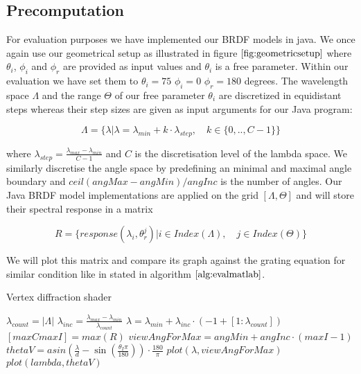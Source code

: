 \subsection{Precomputation}
\label{sec:evalprecomp}
For evaluation purposes we have implemented our BRDF models in java. We once again use our geometrical setup as illustrated in figure $\ref{fig:geometricsetup}$ where $\theta_i$, $\phi_i$ and $\phi_r$ are provided as input values and $\theta_i$ is a free parameter. Within our evaluation we have set them to $\theta_i = 75$ $\phi_i = 0$ $\phi_r = 180$ degrees. The wavelength space $\Lambda$ and the range $\Theta$ of our free parameter $\theta_i$ are discretized in equidistant steps whereas their step sizes are given as input arguments for our Java program:

\begin{equation}
\Lambda = \{\lambda | \lambda = \lambda_{min} + k \cdot \lambda_{step}, \quad k \in \{0,..,C-1\}\}
\label{eq:lambdaspacesetup}
\end{equation}

where $\lambda_{step} = \frac{\lambda_{max}-\lambda_{min}}{C-1}$ and $C$ is the discretisation level of the lambda space. We similarly discretise the angle space by predefining an minimal and maximal angle boundary and $ceil(angMax - angMin) / angInc$ is the number of angles. Our Java BRDF model implementations are applied on the grid $[\Lambda, \Theta]$ and will store their spectral response in a matrix

\begin{equation} 
R = \{response(\lambda_i, \theta_{r}^{j}) | i \in Index(\Lambda), \quad j \in Index(\Theta)\}
\label{eq:responsematrix}
\end{equation}

We will plot this matrix and compare its graph against the grating equation for similar condition like in stated in algorithm $\ref{alg:evalmatlab}$.

\begin{algorithm}[H]
  \caption{Vertex diffraction shader}
  \begin{algorithmic}
    \State $ \lambda_{count} = |\Lambda| $
    \State $ \lambda_{inc} = \frac{\lambda_{max}-\lambda_{min}}{\lambda_{count}}$
    \State $ \lambda = \lambda_{min} + \lambda_{inc} \cdot (-1+[1:\lambda_{count}])$
    \State $ [maxC maxI] = max(R)$
    \State $ viewAngForMax = angMin + angInc \cdot (maxI-1)$
    \State $ thetaV = asin \left( \frac{\lambda}{d} - \sin \left(  \frac{\theta_I \pi}{180} \right) \right) \cdot \frac{180}{\pi}$
    \State $ plot(\lambda, viewAngForMax)$
    \State $ plot(lambda, thetaV)$
  \end{algorithmic}
\label{alg:evalmatlab}
\end{algorithm}

